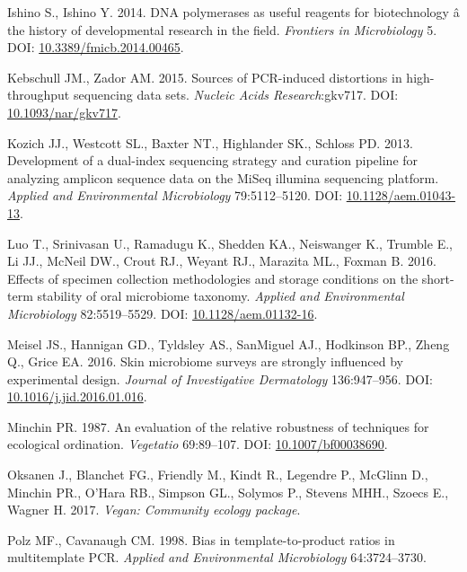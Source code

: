 \documentclass[12pt,]{article}
\begin{document}
\hypertarget{ref-polymerase_Ishino_2014}{}
Ishino S., Ishino Y. 2014. DNA polymerases as useful reagents for
biotechnology â the history of developmental research in the field.
\emph{Frontiers in Microbiology} 5. DOI:
\href{https://doi.org/10.3389/fmicb.2014.00465}{10.3389/fmicb.2014.00465}.

\hypertarget{ref-Kebschull2015}{}
Kebschull JM., Zador AM. 2015. Sources of PCR-induced distortions in
high-throughput sequencing data sets. \emph{Nucleic Acids
Research}:gkv717. DOI:
\href{https://doi.org/10.1093/nar/gkv717}{10.1093/nar/gkv717}.

\hypertarget{ref-protocol_Kozich_2013}{}
Kozich JJ., Westcott SL., Baxter NT., Highlander SK., Schloss PD. 2013.
Development of a dual-index sequencing strategy and curation pipeline
for analyzing amplicon sequence data on the MiSeq illumina sequencing
platform. \emph{Applied and Environmental Microbiology} 79:5112--5120.
DOI: \href{https://doi.org/10.1128/aem.01043-13}{10.1128/aem.01043-13}.

\hypertarget{ref-preservation_Luo_2016}{}
Luo T., Srinivasan U., Ramadugu K., Shedden KA., Neiswanger K., Trumble
E., Li JJ., McNeil DW., Crout RJ., Weyant RJ., Marazita ML., Foxman B.
2016. Effects of specimen collection methodologies and storage
conditions on the short-term stability of oral microbiome taxonomy.
\emph{Applied and Environmental Microbiology} 82:5519--5529. DOI:
\href{https://doi.org/10.1128/aem.01132-16}{10.1128/aem.01132-16}.

\hypertarget{ref-Meisel2016}{}
Meisel JS., Hannigan GD., Tyldsley AS., SanMiguel AJ., Hodkinson BP.,
Zheng Q., Grice EA. 2016. Skin microbiome surveys are strongly
influenced by experimental design. \emph{Journal of Investigative
Dermatology} 136:947--956. DOI:
\href{https://doi.org/10.1016/j.jid.2016.01.016}{10.1016/j.jid.2016.01.016}.

\hypertarget{ref-bc_index_Minchin1987}{}
Minchin PR. 1987. An evaluation of the relative robustness of techniques
for ecological ordination. \emph{Vegetatio} 69:89--107. DOI:
\href{https://doi.org/10.1007/bf00038690}{10.1007/bf00038690}.

\hypertarget{ref-vegan_citation}{}
Oksanen J., Blanchet FG., Friendly M., Kindt R., Legendre P., McGlinn
D., Minchin PR., O'Hara RB., Simpson GL., Solymos P., Stevens MHH.,
Szoecs E., Wagner H. 2017. \emph{Vegan: Community ecology package}.

\hypertarget{ref-polz_bias_1998}{}
Polz MF., Cavanaugh CM. 1998. Bias in template-to-product ratios in
multitemplate PCR. \emph{Applied and Environmental Microbiology}
64:3724--3730.
\end{document}
